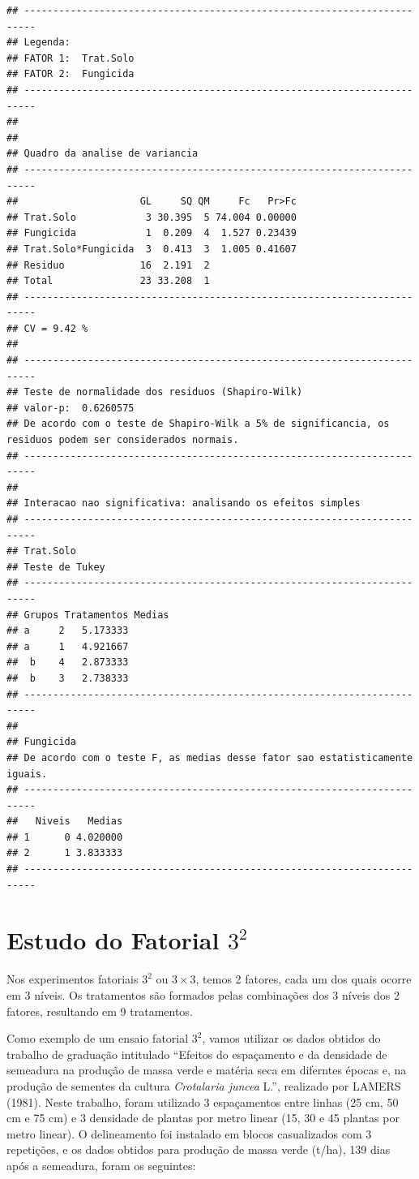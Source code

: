 \documentclass[
]{book}
\begin{document}
\begin{verbatim}
## ------------------------------------------------------------------------
## Legenda:
## FATOR 1:  Trat.Solo 
## FATOR 2:  Fungicida 
## ------------------------------------------------------------------------
## 
## 
## Quadro da analise de variancia
## ------------------------------------------------------------------------
##                     GL     SQ QM     Fc   Pr>Fc
## Trat.Solo            3 30.395  5 74.004 0.00000
## Fungicida            1  0.209  4  1.527 0.23439
## Trat.Solo*Fungicida  3  0.413  3  1.005 0.41607
## Residuo             16  2.191  2               
## Total               23 33.208  1               
## ------------------------------------------------------------------------
## CV = 9.42 %
## 
## ------------------------------------------------------------------------
## Teste de normalidade dos residuos (Shapiro-Wilk)
## valor-p:  0.6260575 
## De acordo com o teste de Shapiro-Wilk a 5% de significancia, os residuos podem ser considerados normais.
## ------------------------------------------------------------------------
## 
## Interacao nao significativa: analisando os efeitos simples
## ------------------------------------------------------------------------
## Trat.Solo
## Teste de Tukey
## ------------------------------------------------------------------------
## Grupos Tratamentos Medias
## a     2   5.173333 
## a     1   4.921667 
##  b    4   2.873333 
##  b    3   2.738333 
## ------------------------------------------------------------------------
## 
## Fungicida
## De acordo com o teste F, as medias desse fator sao estatisticamente iguais.
## ------------------------------------------------------------------------
##   Niveis   Medias
## 1      0 4.020000
## 2      1 3.833333
## ------------------------------------------------------------------------
\end{verbatim}

\hypertarget{estudo-do-fatorial-32}{%
\chapter{\texorpdfstring{Estudo do Fatorial \(3^2\)}{Estudo do Fatorial 3\^{}2}}\label{estudo-do-fatorial-32}}

Nos experimentos fatoriais \(3^2\) ou \(3 \times 3\), temos 2 fatores, cada um dos quais ocorre em 3 níveis. Os tratamentos são formados pelas combinações dos 3 níveis dos 2 fatores, resultando em 9 tratamentos.

Como exemplo de um ensaio fatorial \(3^2\), vamos utilizar os dados obtidos do trabalho de graduação intitulado ``Efeitos do espaçamento e da densidade de semeadura na produção de massa verde e matéria seca em diferntes épocas e, na produção de sementes da cultura \emph{Crotalaria juncea} L.'', realizado por LAMERS (1981). Neste trabalho, foram utilizado 3 espaçamentos entre linhas (25 cm, 50 cm e 75 cm) e 3 densidade de plantas por metro linear (15, 30 e 45 plantas por metro linear). O delineamento foi instalado em blocos casualizados com 3 repetições, e os dados obtidos para produção de massa verde (t/ha), 139 dias após a semeadura, foram os seguintes:
\end{document}
